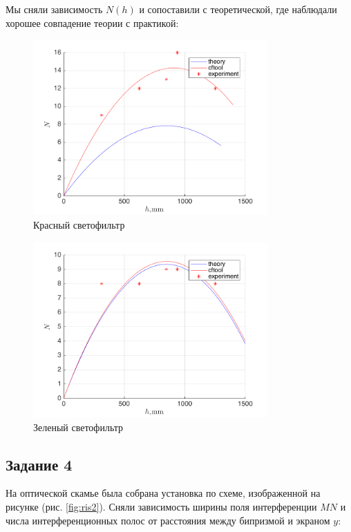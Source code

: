 Мы сняли зависимость $N(h)$ и сопоставили с теоретической, где наблюдали хорошее совпадение теории с практикой:

\begin{figure}[H]
	\centering
	\includegraphics[width=0.8\textwidth]{data/N_r.png}
	\caption{Красный светофильтр}
	\label{fig:dd_g}
\end{figure}
\begin{figure}[H]
	\centering
	\includegraphics[width=0.8\textwidth]{data/N_g.png}
	\caption{Зеленый светофильтр}
	\label{fig:N_g}
\end{figure}

\subsection{Задание 4}
На оптической скамье была собрана установка по схеме, изображенной на рисунке (рис. \ref{fig:ris2}). Сняли зависимость ширины поля интерференции $MN$ и числа интерференционных полос от расстояния между бипризмой	 и экраном $y$:



